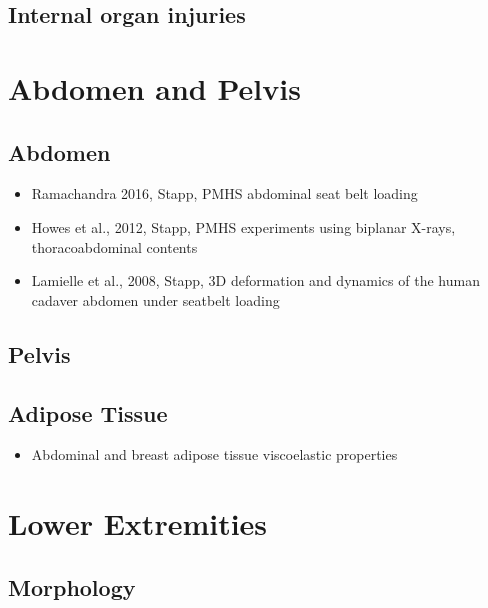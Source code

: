 \documentclass[]{book}
\providecommand{\tightlist}{%
  \setlength{\itemsep}{0pt}\setlength{\parskip}{0pt}}
\begin{document}
\hypertarget{internal-organ-injuries}{%
\section{Internal organ injuries}\label{internal-organ-injuries}}

\hypertarget{abdomen-and-pelvis}{%
\chapter{Abdomen and Pelvis}\label{abdomen-and-pelvis}}

\hypertarget{abdomen}{%
\section{Abdomen}\label{abdomen}}

\begin{itemize}
\tightlist
\item
  Ramachandra 2016, Stapp, PMHS abdominal seat belt loading
\item
  Howes et al., 2012, Stapp, PMHS experiments using biplanar X-rays, thoracoabdominal contents
\item
  Lamielle et al., 2008, Stapp, 3D deformation and dynamics of the human cadaver abdomen under seatbelt loading
\end{itemize}

\hypertarget{pelvis}{%
\section{Pelvis}\label{pelvis}}

\hypertarget{adipose-tissue}{%
\section{Adipose Tissue}\label{adipose-tissue}}

\begin{itemize}
\tightlist
\item
  Abdominal and breast adipose tissue viscoelastic properties \citep{Calvo-Gallego2019}
\end{itemize}

\hypertarget{lower-extremities}{%
\chapter{Lower Extremities}\label{lower-extremities}}

\hypertarget{morphology}{%
\section{Morphology}\label{morphology}}
\end{document}

